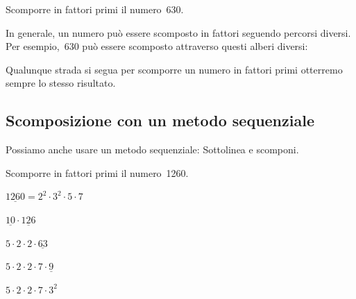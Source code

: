 \begin{inaccessibleblock}[]
 \begin{esempio}{}{}
 Scomporre in fattori primi il numero~630.
 \begin{center}
 
 \end{center}
 \end{esempio}
\end{inaccessibleblock}

In generale, un numero può essere scomposto in fattori seguendo percorsi 
diversi. Per esempio,~630 può essere scomposto attraverso questi alberi
diversi:

\begin{inaccessibleblock}[]
\begin{minipage}{0.40\textwidth}
 \centering
 
\end{minipage}%
\begin{minipage}{0.40\textwidth}
 \centering
 
\end{minipage}%
\end{inaccessibleblock}


Qualunque strada si segua per scomporre un numero in fattori primi 
otterremo sempre lo stesso risultato.

\subsection{Scomposizione con un metodo sequenziale}

Possiamo anche usare un metodo sequenziale:
Sottolinea e scomponi.

 \begin{esempio}{}{}
 Scomporre in fattori primi il numero~1260.

 \(\underline{1260} = 2^{2} \cdot 3^{2} \cdot 5 \cdot 7\)
 
 \(\underline{10} \cdot \underline{126}\)
 
 \(5 \cdot 2 \cdot 2 \cdot \underline{63}\)
 
 \(5 \cdot 2 \cdot 2 \cdot 7 \cdot \underline{9}\)
 
 \(5 \cdot 2 \cdot 2 \cdot 7 \cdot 3^{2}\)
 
 \end{esempio}

